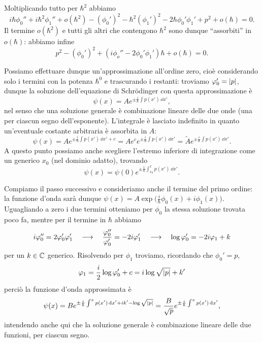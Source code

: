 Moltiplicando tutto per $\hbar^2$ abbiamo
\begin{equation}
	i\hbar\phi_0''+i\hbar^2\phi_1''+o(\hbar^2)-(\phi_0')^2-\hbar^2(\phi_1')^2-2\hbar\phi_0'\phi_1'+p^2+o(\hbar)=0.
\end{equation}
Il termine $o(\hbar^2)$ e tutti gli altri che contengono $\hbar^2$ sono dunque ``assorbiti'' in $o(\hbar)$: abbiamo infine
\begin{equation}
	p^2-(\phi_0')^2+(i\phi_o''-2\phi_0'\phi_1')\hbar+o(\hbar)=0.
	\label{eq:WKB-schroedinger-approssimata}
\end{equation}

Possiamo effettuare dunque un'approssimazione all'ordine zero, cioè considerando solo i termini con la potenza $\hbar^0$ e trascurando i restanti: troviamo $\varphi_0'=\left|{p}\right|$, dunque la soluzione dell'equazione di Schr\"odinger con questa approssimazione è
\begin{equation}
	\psi(x)=Ae^{\pm\frac{i}{\hbar}\int p(x')\,\dd x'},
	\label{eq:soluzione-WKB-ordine-0}
\end{equation}
nel senso che una soluzione generale è combinazione lineare delle due onde (una per ciascun segno dell'esponente).
L'integrale è lasciato indefinito in quanto un'eventuale costante arbitraria è assorbita in $A$:
\begin{equation}
	\psi(x)=Ae^{\pm\frac{i}{\hbar}\int p(x')\,\dd x'+c}=Ae^ce^{\pm\frac{i}{\hbar}\int p(x')\,\dd x'}=\tilde{A}e^{\pm\frac{i}{\hbar}\int p(x')\,\dd x'}.
\end{equation}
A questo punto possiamo anche scegliere l'estremo inferiore di integrazione come un generico $x_0$ (nel dominio adatto), trovando
\begin{equation}
	\psi(x)=\psi(0)e^{\pm\frac{i}{\hbar}\int_{x_0}^x p(x')\,\dd x'}.
\end{equation}

Compiamo il passo successivo e consideriamo anche il termine del primo ordine: la funzione d'onda sarà dunque $\psi(x)=A\exp\big(\frac{i}{\hbar}\phi_0(x)+i\phi_1(x)\big)$.
Uguagliando a zero i due termini otteniamo per $\phi_0$ la stessa soluzione trovata poco fa, mentre per il termine in $\hbar$ abbiamo
\begin{equation}
	i\varphi_0''=2\varphi_0'\varphi_1'\quad\longrightarrow\quad \frac{\varphi_0''}{\varphi_0'}=-2i\varphi_1'\quad\longrightarrow\quad \log\varphi_0'=-2i\varphi_1+k
\end{equation}
per un $k\in\mathbb{C}$ generico.
Risolvendo per $\phi_1$ troviamo, ricordando che $\phi_0'=p$,
\begin{equation}
	\varphi_1=\frac{i}2\log\varphi_0'+c=i\log\sqrt{\left|{p}\right|}+k'
\end{equation}
perciò la funzione d'onda approssimata è
\begin{equation}
	\psi(x)=Be^{\pm\frac{i}{\hbar}\int^xp(x')\,\textup{d} x'+ik'-\log\sqrt{\left|{p}\right|}}=\frac{B}{\sqrt{p}}e^{\pm\frac{i}{\hbar}\int^xp(x')\,\textup{d} x'},
	\label{eq:soluzione-WKB-ordine-1}
\end{equation}
intendendo anche qui che la soluzione generale è combinazione lineare delle due funzioni, per ciascun segno.

